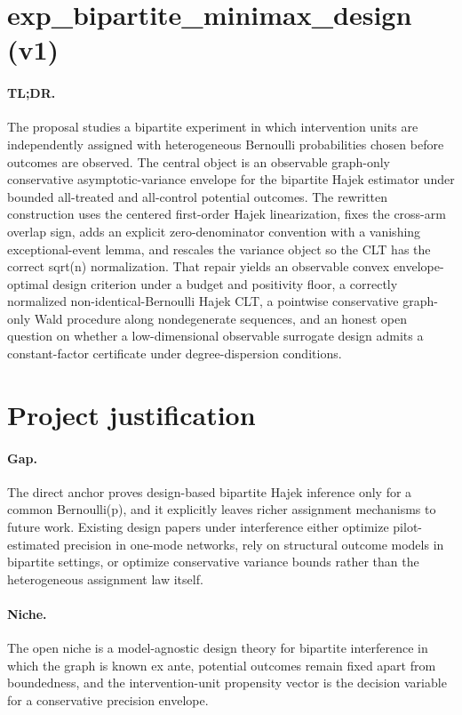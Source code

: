 \documentclass{article}
\begin{document}
\section*{exp_bipartite_minimax_design (v1)}

\paragraph{TL;DR.} The proposal studies a bipartite experiment in which intervention units are independently assigned with heterogeneous Bernoulli probabilities chosen before outcomes are observed. The central object is an observable graph-only conservative asymptotic-variance envelope for the bipartite Hajek estimator under bounded all-treated and all-control potential outcomes. The rewritten construction uses the centered first-order Hajek linearization, fixes the cross-arm overlap sign, adds an explicit zero-denominator convention with a vanishing exceptional-event lemma, and rescales the variance object so the CLT has the correct sqrt(n) normalization. That repair yields an observable convex envelope-optimal design criterion under a budget and positivity floor, a correctly normalized non-identical-Bernoulli Hajek CLT, a pointwise conservative graph-only Wald procedure along nondegenerate sequences, and an honest open question on whether a low-dimensional observable surrogate design admits a constant-factor certificate under degree-dispersion conditions.

\section{Project justification}

\paragraph{Gap.} The direct anchor proves design-based bipartite Hajek inference only for a common Bernoulli(p), and it explicitly leaves richer assignment mechanisms to future work. Existing design papers under interference either optimize pilot-estimated precision in one-mode networks, rely on structural outcome models in bipartite settings, or optimize conservative variance bounds rather than the heterogeneous assignment law itself.

\paragraph{Niche.} The open niche is a model-agnostic design theory for bipartite interference in which the graph is known ex ante, potential outcomes remain fixed apart from boundedness, and the intervention-unit propensity vector is the decision variable for a conservative precision envelope.
\end{document}
